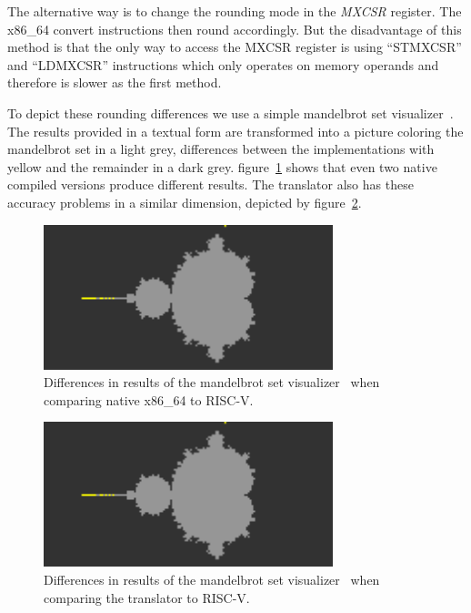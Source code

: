 \documentclass[course=eragp]{aspdoc}
\begin{document}
\par

The alternative way is to change the rounding mode in the \emph{MXCSR} register. The x86\_64 convert
instructions then round accordingly. But the disadvantage of this method is that the only way to
access the MXCSR register is using ``STMXCSR'' and ``LDMXCSR'' instructions which only operates on
memory operands and therefore is slower as the first method.~\cite{intel2017man}

\par

To depict these rounding differences we use a simple mandelbrot set
visualizer~\cite{mandelbrot_program}. The results provided in a textual form are transformed into a
picture coloring the mandelbrot set in a light grey, differences between the implementations with
yellow and the remainder in a dark grey. figure~\ref{fig:mandelbrot_diff_native_x86} shows that even
two native compiled versions produce different results. The translator also has these accuracy
problems in a similar dimension, depicted by figure~\ref{fig:mandelbrot_diff_translator}.

\par

\begin{figure}[ht]
    \centering
    \includegraphics[width=0.75\textwidth]{images/mandelbrot_differences/x86_diff.png}
    \caption{Differences in results of the mandelbrot set visualizer~\cite{mandelbrot_program} when
        comparing native x86\_64 to RISC-V.}
    \label{fig:mandelbrot_diff_native_x86}
\end{figure}

\begin{figure}[ht]
    \centering
    \includegraphics[width=0.75\textwidth]{images/mandelbrot_differences/translated_diff.png}
    \caption{Differences in results of the mandelbrot set visualizer~\cite{mandelbrot_program} when
        comparing the translator to RISC-V.}
    \label{fig:mandelbrot_diff_translator}
\end{figure}
\end{document}
